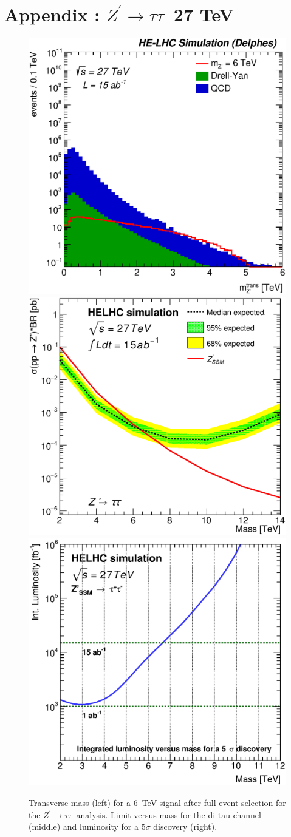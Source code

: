 \documentclass{cernrep}
\newcommand*{\Zptata}{\ensuremath{Z^{\prime}\rightarrow \tau\tau}}
\begin{document}
\clearpage
\newpage

\section{Appendix : \Zptata\  27 TeV}
\label{appendix:zptautau27}

\begin{figure}[!htb]
  \centering
  \includegraphics[width=0.32\columnwidth]{Fig/27tev/Zptautau_mt_sel0_nostack_log.eps}
  \includegraphics[width=0.32\columnwidth]{Fig/27tev/lim_Zprime_tautau_helhc_v01.eps}
  \includegraphics[width=0.32\columnwidth]{Fig/27tev/DiscoveryPotential_tautau_rootStyle.eps}
  \caption{Transverse mass (left) for a 6~TeV signal after full event selection for the \Zptata\ analysis. Limit versus mass for the di-tau channel (middle) and luminosity for a $5\sigma$ discovery (right).}
  \label{figure:leptonicresonances27:tautau}
\end{figure}
\end{document}
